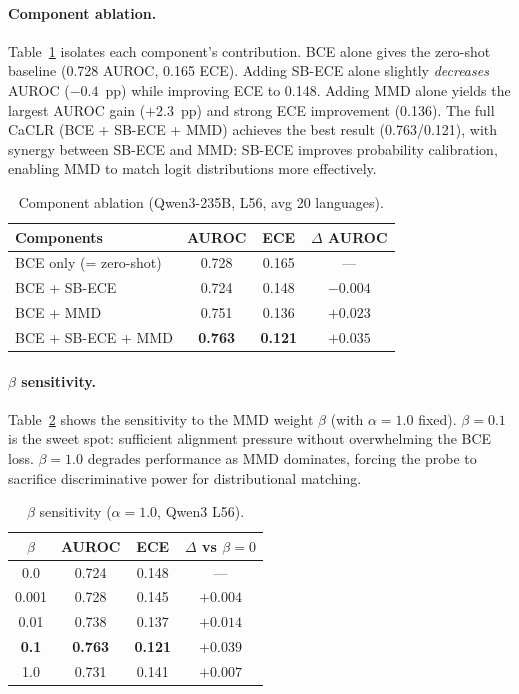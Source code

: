\documentclass[11pt,a4paper]{article}
\begin{document}
\paragraph{Component ablation.}
Table~\ref{tab:ablation} isolates each component's contribution.
BCE alone gives the zero-shot baseline (0.728 AUROC, 0.165 ECE).
Adding SB-ECE alone slightly \emph{decreases} AUROC ($-0.4$~pp) while improving ECE to 0.148.
Adding MMD alone yields the largest AUROC gain ($+2.3$~pp) and strong ECE improvement (0.136).
The full CaCLR (BCE + SB-ECE + MMD) achieves the best result (0.763/0.121), with synergy between SB-ECE and MMD: SB-ECE improves probability calibration, enabling MMD to match logit distributions more effectively.

\begin{table}[t]
\centering
\caption{Component ablation (Qwen3-235B, L56, avg 20 languages).}
\label{tab:ablation}
\small
\begin{tabular}{lccc}
\toprule
\textbf{Components} & \textbf{AUROC} & \textbf{ECE} & \textbf{$\Delta$ AUROC} \\
\midrule
BCE only (= zero-shot) & 0.728 & 0.165 & --- \\
BCE + SB-ECE           & 0.724 & 0.148 & $-0.004$ \\
BCE + MMD              & 0.751 & 0.136 & $+0.023$ \\
BCE + SB-ECE + MMD     & \textbf{0.763} & \textbf{0.121} & $+0.035$ \\
\bottomrule
\end{tabular}
\end{table}

\paragraph{$\beta$ sensitivity.}
Table~\ref{tab:beta} shows the sensitivity to the MMD weight $\beta$ (with $\alpha = 1.0$ fixed).
$\beta = 0.1$ is the sweet spot: sufficient alignment pressure without overwhelming the BCE loss.
$\beta = 1.0$ degrades performance as MMD dominates, forcing the probe to sacrifice discriminative power for distributional matching.

\begin{table}[t]
\centering
\caption{$\beta$ sensitivity ($\alpha = 1.0$, Qwen3 L56).}
\label{tab:beta}
\small
\begin{tabular}{cccc}
\toprule
\textbf{$\beta$} & \textbf{AUROC} & \textbf{ECE} & \textbf{$\Delta$ vs $\beta\!=\!0$} \\
\midrule
0.0    & 0.724 & 0.148 & --- \\
0.001  & 0.728 & 0.145 & $+0.004$ \\
0.01   & 0.738 & 0.137 & $+0.014$ \\
\textbf{0.1} & \textbf{0.763} & \textbf{0.121} & $+0.039$ \\
1.0    & 0.731 & 0.141 & $+0.007$ \\
\bottomrule
\end{tabular}
\end{table}
\end{document}

